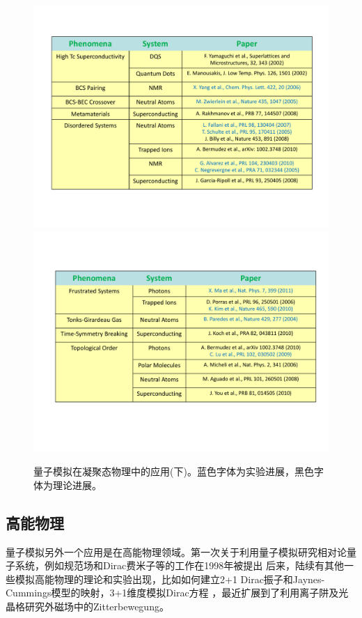 \begin{figure}[htbp]
            \begin{center}
              \includegraphics[width= 0.8\columnwidth]{figures/simcondense3.pdf}
              \includegraphics[width= 0.8\columnwidth]{figures/simcondense4.pdf}
              \caption{量子模拟在凝聚态物理中的应用(下)。蓝色字体为实验进展，黑色字体为理论进展。
              }
              \label{supersim}
            \end{center}
\end{figure}

  \subsection{高能物理}

量子模拟另外一个应用是在高能物理领域。第一次关于利用量子模拟研究相对论量子系统，例如规范场和Dirac费米子等的工作在1998年被提出\cite{energy1}
后来，陆续有其他一些模拟高能物理的理论和实验出现，比如如何建立2+1 Dirac振子和Jaynes-Cummings模型的映射\cite{dirac1}，3+1维度模拟Dirac方程\cite{dirac2,dirac} ，最近扩展到了利用离子阱\cite{energy2}及光晶格\cite{energy3}研究外磁场中的Zitterbewegung。

